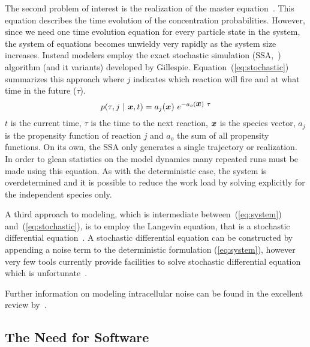 \documentclass[12pt]{article}
\newcommand{\bx}{\mbox{\boldmath $x$}}
\begin{document}
The second problem of interest is the realization of the master
equation~\citep{Wilkinson:Book}. This equation describes the time
evolution of the concentration probabilities. However, since we need
one time evolution equation for every particle state in the system, the
system of equations becomes unwieldy very rapidly as the system size
increases. Instead modelers employ the exact stochastic simulation
(SSA,~\citet{Gill:1976}) algorithm (and it variants) developed by
Gillespie. Equation~(\ref{eq:stochastic}) summarizes this approach
where $j$ indicates which reaction will fire and at what time in the
future ($\tau$).
%
\begin{equation}
p (\tau, j\ |\ \bx, t) = a_j(\bx)\ e^{-a_o(\bx)\ \tau} \label{eq:stochastic}
\end{equation}
%
$t$ is the current time, $\tau$ is the time to the next
reaction, $\bx$ is the species vector, $a_j$ is the propensity function of reaction $j$ and $a_o$
the sum of all propensity functions. On its own, the SSA only
generates a single trajectory or realization. In order to glean
statistics on the model dynamics many repeated runs must be made
using this equation. As with the deterministic case, the system is
overdetermined and it is possible to reduce the work load by solving
explicitly for the independent species only.

A third approach to modeling, which is intermediate between~(\ref{eq:system}) and~(\ref{eq:stochastic}), is to employ the Langevin equation, that is a stochastic differential equation~\citep{StochasticDiff:2001}. A stochastic differential equation can be constructed by appending a noise term to the deterministic formulation (\ref{eq:system}), however very few tools currently provide facilities to solve
stochastic differential equation which is unfortunate~\citep{Adalsteinsson:2004,ChickarmaneP53:2007}.

Further information on modeling intracellular noise can be found in
the excellent review by~\citet{RaoNature2002}.

\subsection{The Need for Software}
\end{document}
